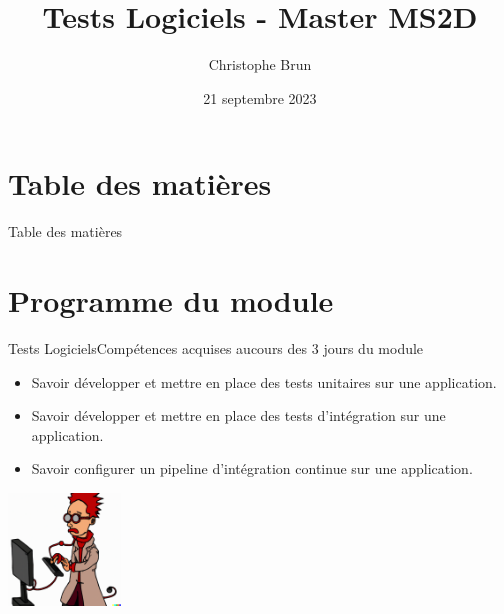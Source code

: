 \documentclass{beamer}
\title{Tests Logiciels - Master MS2D}
\author{Christophe Brun}
\institute{Campus Saint-Michel IT}
\date{21 septembre 2023}
\begin{document}
    \begin{frame}
        \transdissolve
        \titlepage
    \end{frame}


    \section{Table des matières}\label{sec:toc}
    \begin{frame}{Table des matières}
        \begin{tiny}
            \tableofcontents
        \end{tiny}
    \end{frame}


    \section{Programme du module}\label{sec:programme-du-module}
    \begin{frame}{Tests Logiciels}{Compétences acquises aucours des 3 jours du module}
        \transdissolve
        \begin{itemize}
            \item Savoir développer et mettre en place des tests unitaires sur une application.

            \item Savoir développer et mettre en place des tests d’intégration sur une application.

            \item Savoir configurer un pipeline d’intégration continue sur une application.

        \end{itemize}
        \centering
        \includegraphics[width=3cm]{image/funny-cartoon-of-a-smart-young-computer-scientist}
    \end{frame}
\end{document}
